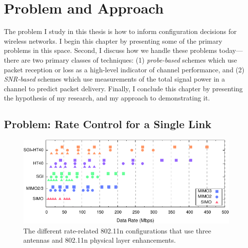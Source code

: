 \ifx\mainfile\undefined

\setcounter{chapter}{2} %
\fi

\cleardoublepage
\chapter{Problem and Approach}
\label{chap:problem}
\label{chap:approach}

The problem I study in this thesis is how to inform configuration decisions for wireless networks. I begin this chapter by presenting some of the primary problems in this space. Second, I discuss how we handle these problems today---there are two primary classes of techniques: (1) \emph{probe-based} schemes which use packet reception or loss as a high-level indicator of channel performance, and (2) \emph{SNR-based} schemes which use measurements of the total signal power in a channel to predict packet delivery. Finally, I conclude this chapter by presenting the hypothesis of my research, and my approach to demonstrating it.


%
\section{Problem: Rate Control for a Single Link}
\begin{figure}[t]
	\centering
	\includegraphics[width=\textwidth]{figures/rate_configs.pdf}
	\caption[The rate-related 802.11n configurations that use three antennas]{\label{fig:rate_configs}The different rate-related 802.11n configurations that use three antennas and 802.11n physical layer enhancements.}
\end{figure}

